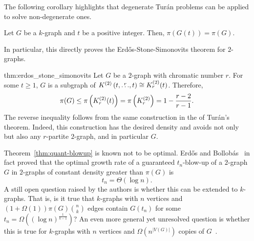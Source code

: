 The following corollary highlights that degenerate Turán problems can be applied to solve non-degenerate ones.
\begin{corollary}
    Let $G$ be a $k$-graph and $t$ be a positive integer.
    Then, $\pi(G(t)) = \pi(G)$.
\end{corollary}

In particular, this directly proves the Erdős-Stone-Simonovits theorem for $2$-graphs.

\begin{delayedproof}{thm:erdos_stone_simonovits}
    Let $G$ be a $2$-graph with chromatic number $r$.
    For some $t \geq 1$, $G$ is a subgraph of $K^{(2)}\left(t, \overset{r}{\dots}, t\right) \cong K^{(2)}_{r}(t)$.
    Therefore,
    \[
        \pi(G) \leq \pi\left(K^{(2)}_{r}(t)\right) = \pi\left(K^{(2)}_{r}\right) = 1 - \frac{r-2}{r-1}.
    \]
    The reverse inequality follows from the same construction in the  of Turán's theorem.
    Indeed, this construction has the desired density and avoids not only  but also
    any $r$-partite $2$-graph, and in particular $G$.
\end{delayedproof}

Theorem~\ref{thm:quant-blowup} is known not to be optimal.
Erdős and Bollobás~\cite{bollobas1973structure} in fact proved that the optimal growth
rate of a guaranteed $t_n$-blow-up of a $2$-graph $G$ in $2$-graphs of constant density greater than $\pi(G)$ is
\[
    t_n = \Theta (\log n).
\]
A still open question raised by the authors is whether this can be extended to $k$-graphs.
That is, is it true that $k$-graphs with $n$ vertices and  $\left( 1 + \Omega(1) \right) \pi(G) \binom{n}{k}$ edges
contain $G(t_n)$ for some $t_n = \Omega \left((\log n)^{\frac{1}{k-1}}\right)$?
An even more general yet unresolved question is whether this is true for
$k$-graphs with $n$ vertices and $\Omega (n^{|V(G)|})$ copies of $G$~\cite{rodl2012complete}.